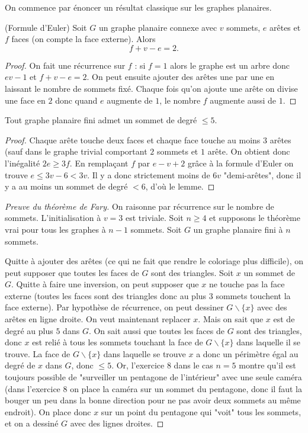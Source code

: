 On commence par énoncer un résultat classique sur les graphes planaires.

\begin{thm} (Formule d'Euler)
Soit $G$ un graphe planaire connexe avec $v$ sommets, $e$ arêtes et $f$ faces (on compte la face externe). Alors
\[f+v-e=2.\]
\end{thm}

\begin{proof}
On fait une récurrence sur $f$ : si $f=1$ alors le graphe est un arbre donc $ev-1$ et $f+v-e=2$. On peut ensuite ajouter des arêtes une par une en laissant le nombre de sommets fixé. Chaque fois qu'on ajoute une arête on divise une face en $2$ donc quand $e$ augmente de $1$, le nombre $f$ augmente aussi de $1$.
\end{proof}

\begin{lem}
Tout graphe planaire fini admet un sommet de degré $\leq 5$.
\end{lem}

\begin{proof}
Chaque arête touche deux faces et chaque face touche au moins $3$ arêtes (sauf dans le graphe trivial comportant $2$ sommets et $1$ arête. On obtient donc l'inégalité $2e \geq 3f$. En remplaçant $f$ par $e-v+2$ grâce à la formule d'Euler on trouve $e \leq 3v-6<3v$. Il y a donc strictement moins de $6v$ "demi-arêtes", donc il y a au moins un sommet de degré $<6$, d'où le lemme. 
\end{proof}

\begin{proof}[Preuve du théorème de Fary]
On raisonne par récurrence sur le nombre de sommets. L'initialisation à $v=3$ est triviale. Soit $n \geq 4$ et supposons le théorème vrai pour tous les graphes à $n-1$ sommets. Soit $G$ un graphe planaire fini à $n$ sommets.

Quitte à ajouter des arêtes (ce qui ne fait que rendre le coloriage plus difficile), on peut supposer que toutes les faces de $G$ sont des triangles. Soit $x$ un sommet de $G$. Quitte à faire une inversion, on peut supposer que $x$ ne touche pas la face externe (toutes les faces sont des triangles donc au plus $3$ sommets touchent la face externe). Par hypothèse de récurrence, on peut dessiner $G \backslash \{ x \}$ avec des arêtes en ligne droite. On veut maintenant replacer $x$. Mais on sait que $x$ est de degré au plus $5$ dans $G$. On sait aussi que toutes les faces de $G$ sont des triangles, donc $x$ est relié à tous les sommets touchant la face de $G \backslash \{x \}$ dans laquelle il se trouve. La face de $G \backslash \{ x \}$ dans laquelle se trouve $x$ a donc un périmètre égal au degré de $x$ dans $G$, donc $\leq 5$. Or, l'exercice $8$ dans le cas $n=5$ montre qu'il est toujours possible de "surveiller un pentagone de l'intérieur" avec une seule caméra (dans l'exercice $8$ on place la caméra sur un sommet du pentagone, donc il faut la bouger un peu dans la bonne direction pour ne pas avoir deux sommets au même endroit). On place donc $x$ sur un point du pentagone qui "voit" tous les sommets, et on a dessiné $G$ avec des lignes droites.
\end{proof}
